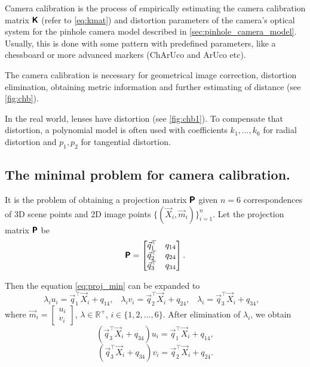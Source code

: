 Camera calibration is the process of empirically estimating the camera calibration matrix $\pmb{\mathsf{K}}$ (refer to \eqref{eq:kmat}) and distortion parameters of the camera's optical system for the pinhole camera model described in \autoref{sec:pinhole_camera_model}.
Usually, this is done with some pattern with predefined parameters, like a chessboard or more advanced markers (ChArUco and ArUco \cite{aruco} etc).

The camera calibration is necessary for geometrical image correction, distortion elimination, obtaining metric information and further estimating of distance (see \autoref{fig:chb}). 

In the real world, lenses have distortion (see \autoref{fig:chb1}).
To compensate that distortion, a polynomial model is often used with coefficients $k_1, ... , k_6$ for radial distortion and $p_1, p_2$ for tangential distortion.

\subsection{The minimal problem for camera calibration.} 
It is the problem of obtaining a projection matrix $\pmb{\mathsf{P}}$ given $n=6$ correspondences of 3D scene points and 2D image points $\{(\vec{X}_i, \vec{m}_i)\}_{i=1}^n$.
Let the projection matrix $\pmb{\mathsf{P}}$ be 
\begin{equation}
    \label{eq:p_calib}
    \pmb{\mathsf{P}} = \begin{bmatrix}
        \vec{q}_1^\top & q_{14} \\
        \vec{q}_2^\top & q_{24} \\
        \vec{q}_3^\top & q_{34} \\
    \end{bmatrix}.
\end{equation}

Then the equation \eqref{eq:proj_min} can be expanded to
\begin{equation}
    \lambda_i u_i = \vec{q}_1^\top \vec{X}_i + q_{14}, \;\;\;
    \lambda_i v_i = \vec{q}_2^\top \vec{X}_i + q_{24}, \;\;\;
    \lambda_i = \vec{q}_3^\top \vec{X}_i + q_{34}, \;\;\;
\end{equation}
where $\vec{m}_i = \begin{bmatrix} u_i \\ v_i \end{bmatrix}$, $ \lambda \in \mathbb{R}^{+}$, $i \in \{1, 2, ..., 6\}$.
After elimination of $\lambda_i$, we obtain
\begin{equation}
    (\vec{q}_3^\top \vec{X}_i + q_{34})u_i = \vec{q}_1^\top \vec{X}_i + q_{14},
\end{equation}
\begin{equation}
    (\vec{q}_3^\top \vec{X}_i + q_{34})v_i = \vec{q}_2^\top \vec{X}_i + q_{24}.
\end{equation}

